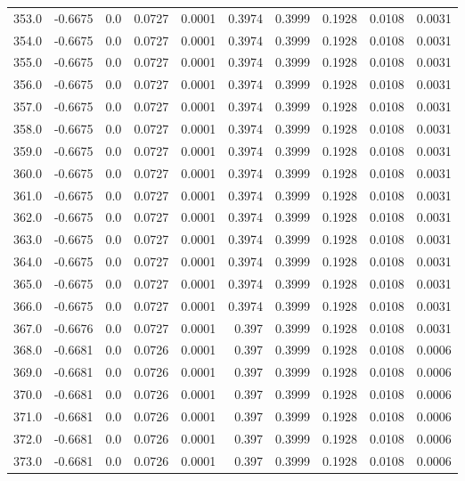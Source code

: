 \begin{longtable}{lrrrrrrrrr}
353.0 & -0.6675 & 0.0 & 0.0727 & 0.0001 & 0.3974 & 0.3999 & 0.1928 & 0.0108 & 0.0031 \\
354.0 & -0.6675 & 0.0 & 0.0727 & 0.0001 & 0.3974 & 0.3999 & 0.1928 & 0.0108 & 0.0031 \\
355.0 & -0.6675 & 0.0 & 0.0727 & 0.0001 & 0.3974 & 0.3999 & 0.1928 & 0.0108 & 0.0031 \\
356.0 & -0.6675 & 0.0 & 0.0727 & 0.0001 & 0.3974 & 0.3999 & 0.1928 & 0.0108 & 0.0031 \\
357.0 & -0.6675 & 0.0 & 0.0727 & 0.0001 & 0.3974 & 0.3999 & 0.1928 & 0.0108 & 0.0031 \\
358.0 & -0.6675 & 0.0 & 0.0727 & 0.0001 & 0.3974 & 0.3999 & 0.1928 & 0.0108 & 0.0031 \\
359.0 & -0.6675 & 0.0 & 0.0727 & 0.0001 & 0.3974 & 0.3999 & 0.1928 & 0.0108 & 0.0031 \\
360.0 & -0.6675 & 0.0 & 0.0727 & 0.0001 & 0.3974 & 0.3999 & 0.1928 & 0.0108 & 0.0031 \\
361.0 & -0.6675 & 0.0 & 0.0727 & 0.0001 & 0.3974 & 0.3999 & 0.1928 & 0.0108 & 0.0031 \\
362.0 & -0.6675 & 0.0 & 0.0727 & 0.0001 & 0.3974 & 0.3999 & 0.1928 & 0.0108 & 0.0031 \\
363.0 & -0.6675 & 0.0 & 0.0727 & 0.0001 & 0.3974 & 0.3999 & 0.1928 & 0.0108 & 0.0031 \\
364.0 & -0.6675 & 0.0 & 0.0727 & 0.0001 & 0.3974 & 0.3999 & 0.1928 & 0.0108 & 0.0031 \\
365.0 & -0.6675 & 0.0 & 0.0727 & 0.0001 & 0.3974 & 0.3999 & 0.1928 & 0.0108 & 0.0031 \\
366.0 & -0.6675 & 0.0 & 0.0727 & 0.0001 & 0.3974 & 0.3999 & 0.1928 & 0.0108 & 0.0031 \\
367.0 & -0.6676 & 0.0 & 0.0727 & 0.0001 & 0.397 & 0.3999 & 0.1928 & 0.0108 & 0.0031 \\
368.0 & -0.6681 & 0.0 & 0.0726 & 0.0001 & 0.397 & 0.3999 & 0.1928 & 0.0108 & 0.0006 \\
369.0 & -0.6681 & 0.0 & 0.0726 & 0.0001 & 0.397 & 0.3999 & 0.1928 & 0.0108 & 0.0006 \\
370.0 & -0.6681 & 0.0 & 0.0726 & 0.0001 & 0.397 & 0.3999 & 0.1928 & 0.0108 & 0.0006 \\
371.0 & -0.6681 & 0.0 & 0.0726 & 0.0001 & 0.397 & 0.3999 & 0.1928 & 0.0108 & 0.0006 \\
372.0 & -0.6681 & 0.0 & 0.0726 & 0.0001 & 0.397 & 0.3999 & 0.1928 & 0.0108 & 0.0006 \\
373.0 & -0.6681 & 0.0 & 0.0726 & 0.0001 & 0.397 & 0.3999 & 0.1928 & 0.0108 & 0.0006 \\

\end{longtable}
